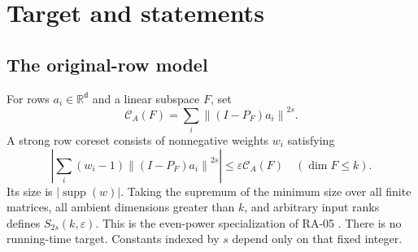 \documentclass[11pt]{article}
\theoremstyle{remark}\newtheorem{remark}[theorem]{Remark}
\newcommand{\R}{\mathbb R}\newcommand{\E}{\mathbb E}\newcommand{\Prob}{\mathbb P}
\newcommand{\eps}{\varepsilon}\newcommand{\Sym}{\operatorname{Sym}}
\newcommand{\supp}{\operatorname{supp}}\newcommand{\op}{\mathrm{op}}\newcommand{\HS}{\mathrm{HS}}
\newcommand{\norm}[1]{\left\|#1\right\|}\newcommand{\ip}[2]{\left\langle #1,#2\right\rangle}
\newcommand{\cost}{\mathcal C}\newcommand{\OPT}{\mathsf{OPT}}
\begin{document}
\section{Target and statements}
\subsection{The original-row model}
For rows $a_i\in\R^{\mathsf d}$ and a linear subspace $F$, set
\[
 \cost_A(F)=\sum_i\norm{(I-P_F)a_i}^{2s}.
\]
A strong row coreset consists of nonnegative weights $w_i$ satisfying
\begin{equation}\label{eq:strong}
 \left|\sum_i(w_i-1)\norm{(I-P_F)a_i}^{2s}\right|
 \le\eps\cost_A(F)\quad(\dim F\le k).
\end{equation}
Its size is $|\supp(w)|$. Taking the supremum of the minimum size over all finite matrices, all ambient dimensions greater than $k$, and arbitrary input ranks defines $S_{2s}(k,\eps)$. This is the even-power specialization of RA-05 \cite{ra05}. There is no running-time target. Constants indexed by $s$ depend only on that fixed integer.
\end{document}
